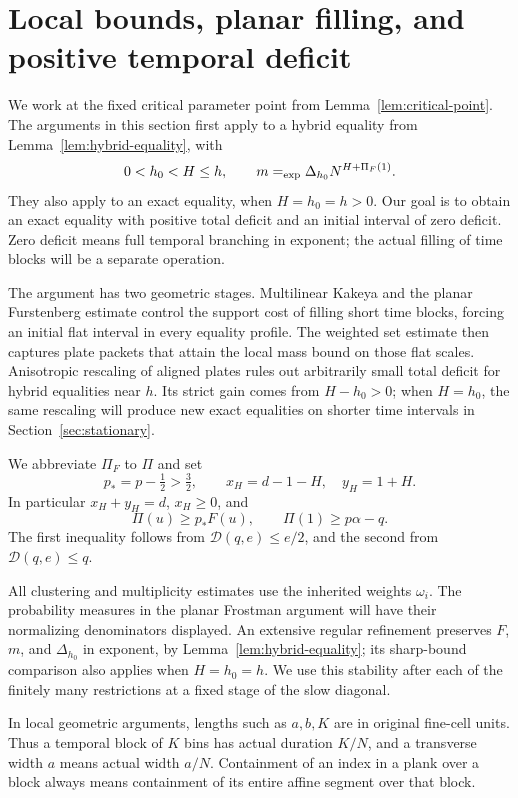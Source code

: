 \section{Local bounds, planar filling, and positive temporal deficit}
\label{sec:local}

We work at the fixed critical parameter point from
Lemma~\ref{lem:critical-point}.  The arguments in this section first
apply to a hybrid equality from Lemma~\ref{lem:hybrid-equality}, with
\[
 0<h_0<H\leq h,\qquad
 m\mathrel{=_{\mathrm{exp}}}\Delta_{h_0}N^{H+\Pi_F(1)}.
\]
They also apply to an exact equality, when $H=h_0=h>0$.
Our goal is to obtain an exact equality with positive total deficit
and an initial interval of zero deficit.  Zero deficit means full
temporal branching in exponent; the actual filling of time blocks
will be a separate operation.

The argument has two geometric stages.  Multilinear Kakeya and the
planar Furstenberg estimate control the support cost of filling short
time blocks, forcing an initial flat interval in every equality
profile.  The weighted set estimate then captures plate packets that attain
the local mass bound on those flat scales.  Anisotropic rescaling of aligned plates rules
out arbitrarily small total deficit for hybrid equalities near $h$.
Its strict gain comes from $H-h_0>0$; when $H=h_0$, the same
rescaling will produce new exact equalities on shorter time intervals
in Section~\ref{sec:stationary}.

We abbreviate $\Pi_F$ to $\Pi$ and set
\[
 p_*=p-\tfrac12>\tfrac32,\qquad
 x_H=d-1-H,\quad y_H=1+H.
\]
In particular $x_H+y_H=d$, $x_H\geq0$, and
\begin{equation}
 \Pi(u)\geq p_*F(u),\qquad
 \Pi(1)\geq p\alpha-q.
 \label{loc:cost-lower}
\end{equation}
The first inequality follows from
$\mathcal D(q,e)\leq e/2$, and the second from
$\mathcal D(q,e)\leq q$.

All clustering and multiplicity estimates use the inherited weights
$\omega_i$.  The probability measures in the planar Frostman argument
will have their normalizing denominators displayed.  An extensive
regular refinement preserves $F$, $m$, and $\Delta_{h_0}$ in exponent,
by Lemma~\ref{lem:hybrid-equality}; its sharp-bound comparison also
applies when $H=h_0=h$.  We use this stability after each of the
finitely many restrictions at a fixed stage of the slow diagonal.

In local geometric arguments, lengths such as $a,b,K$ are in original
fine-cell units.  Thus a temporal block of $K$ bins has actual duration
$K/N$, and a transverse width $a$ means actual width $a/N$.
Containment of an index in a plank over a block always means containment
of its entire affine segment over that block.

